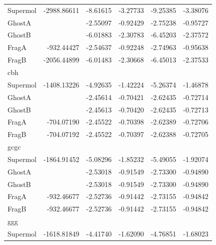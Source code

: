 \documentclass[journal=jctcce,manuscript=article]{achemso}
\begin{document}
\begin{spacing}{1}
\begin{longtable}[H]{lRRRRR}
    Supermol & -2988.86611          & -8.61615      & -3.27733      & -9.25385      & -3.38076      \\
    GhostA   &                      & -2.55097      & -0.92429      & -2.75238      & -0.95727      \\
    GhostB   &                      & -6.01883      & -2.30783      & -6.45203      & -2.37572      \\
    FragA    & -932.44427           & -2.54637      & -0.92248      & -2.74963      & -0.95638      \\
    FragB    & -2056.44899          & -6.01483      & -2.30668      & -6.45013      & -2.37533      \\
    cbh      &                      &               &               &               &               \\
    Supermol & -1408.13226          & -4.92635      & -1.42224      & -5.26374      & -1.46878      \\
    GhostA   &                      & -2.45614      & -0.70421      & -2.62435      & -0.72714      \\
    GhostB   &                      & -2.45613      & -0.70420      & -2.62435      & -0.72713      \\
    FragA    & -704.07190           & -2.45522      & -0.70398      & -2.62389      & -0.72706      \\
    FragB    & -704.07192           & -2.45522      & -0.70397      & -2.62388      & -0.72705      \\
    gcgc     &                      &               &               &               &               \\
    Supermol & -1864.91452          & -5.08296      & -1.85232      & -5.49055      & -1.92074      \\
    GhostA   &                      & -2.53018      & -0.91549      & -2.73300      & -0.94890      \\
    GhostB   &                      & -2.53018      & -0.91549      & -2.73300      & -0.94890      \\
    FragA    & -932.46677           & -2.52736      & -0.91442      & -2.73155      & -0.94842      \\
    FragB    & -932.46677           & -2.52736      & -0.91442      & -2.73155      & -0.94842      \\
    ggg      &                      &               &               &               &               \\
    Supermol & -1618.81849          & -4.41740      & -1.62090      & -4.76851      & -1.68023      \\

\end{longtable}
\end{spacing}
\end{document}
